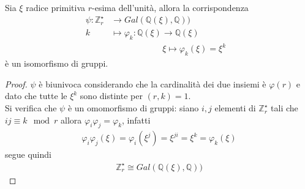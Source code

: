 \begin{teorema}
Sia $\xi$ radice primitiva $r$-esima dell'unità, allora la corrispondenza
\begin{align*}
\psi: \mathbb{Z}_{r}^{\star} & \longrightarrow  Gal(\mathbb{Q}(\xi), \mathbb{Q})) &   \\
                           k &\longmapsto  \varphi_{k} : \mathbb{Q}(\xi)  \longrightarrow  \mathbb{Q}(\xi) \\
                                              & \qquad \qquad \qquad \xi \longmapsto \varphi_{k}(\xi) = \xi^{k}
\end{align*}
è un isomorfismo di gruppi.
\end{teorema}
\begin{proof}
$\psi$ è biunivoca considerando che la cardinalità dei due insiemi è $\varphi(r)$ e dato che tutte le $\xi^k$ sono distinte per $(r,k)=1$.\\
Si verifica che $\psi$ è un omomorfismo di gruppi:
siano $i,j$ elementi di $\mathbb{Z}_{r}^{\star}$ tali che $ij \equiv k \mod{r}$ allora $\varphi_{i}\varphi_{j} = \varphi_{k}$, infatti
\begin{align*}
   \varphi_{i}\varphi_{j}(\xi) = \varphi_{i}(\xi^{j}) = \xi^{ji} = \xi^{k} = \varphi_{k}(\xi)
\end{align*}
segue quindi
\begin{align*}
   \mathbb{Z}_{r}^{\star} \cong  Gal(\mathbb{Q}(\xi), \mathbb{Q})) 
\end{align*}
\end{proof}

